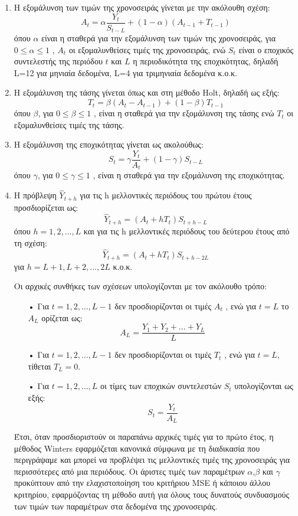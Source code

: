 \begin{enumerate}
\item Η εξομάλυνση των τιμών της χρονοσειράς γίνεται με την ακόλουθη σχέση:\\
$$ A_t=\alpha \frac{Y_t}{S_{t-L}}+\left(1-\alpha\right)\left(A_{t-1}+T_{t-1}\right) $$
όπου $\alpha$ είναι η σταθερά για την εξομάλυνση των τιμών της χρονοσειράς, για
$0 \leq \alpha \leq 1$ , $A_t$ οι εξομαλυνθείσες τιμές της χρονοσειράς, ενώ $S_t$ είναι ο εποχικός
συντελεστής της περιόδου $t$ και $L$ η περιοδικότητα της εποχικότητας, δηλαδή L=12
για μηνιαία δεδομένα, L=4 για τριμηνιαία δεδομένα κ.ο.κ.
\item Η εξομάλυνση της τάσης γίνεται όπως και στη μέθοδο Holt, δηλαδή ως εξής:\\
$$ T_t=\beta \left(A_t-A_{t-1}\right)+\left(1-\beta\right)T_{t-1} $$
όπου $\beta $, για $0 \leq \beta \leq 1$ , είναι η σταθερά για την εξομάλυνση της τάσης ενώ $T_t$ οι
εξομαλυνθείσες τιμές της τάσης.
\item Η εξομάλυνση της εποχικότητας γίνεται ως ακολούθως:\\
$$ S_t=\gamma \frac{Y_t}{A_t}+\left(1-\gamma\right)S_{t-L} $$
όπου $\gamma$, για $0 \leq \gamma \leq 1$ , είναι η σταθερά για την εξομάλυνση της εποχικότητας.
\item Η πρόβλεψη $ \widehat{Y}_{t+h}$ για τις h μελλοντικές περιόδους του πρώτου έτους προσδιορίζεται
ως:\\
$$ \widehat{Y}_{t+h}=\left(A_t+hT_t\right)S_{t+h-L}  $$
όπου $h=1,2,\ldots,L$
και για τις h μελλοντικές περιόδους του δεύτερου έτους από τη σχέση:\\
$$ \widehat{Y}_{t+h}=\left(A_t+hT_t\right)S_{t+h-2L} $$
για $h=L+1, L+2,\ldots,2L$ κ.ο.κ.


Οι αρχικές συνθήκες των σχέσεων υπολογίζονται με τον ακόλουθο τρόπο:\\
\begin{enumerate}
\item[•] Για $t = 1, 2, ..., L-1$ δεν προσδιορίζονται οι τιμές $A_t$ , ενώ για $t=L$ το $A_L$
ορίζεται ως:\\
$$ A_L=\frac{Y_1+Y_2+\ldots+Y_L}{L} $$
\item[•] Για $t = 1, 2,\ldots, L-1$ δεν προσδιορίζονται οι τιμές $T_t$ , ενώ για $t = L$, τίθεται
$T_L =0$.
\item[•] Για $t = 1, 2,\ldots,L$ οι τίμες των εποχικών συντελεστών $S_t$ υπολογίζονται ως
εξής:\\
$$ S_t=\frac{Y_t}{A_L} $$
\end{enumerate}
Έτσι, όταν προσδιοριστούν οι παραπάνω αρχικές τιμές για το πρώτο έτος, η
μέθοδος Winters εφαρμόζεται κανονικά σύμφωνα με τη διαδικασία που
περιγράψαμε και μπορεί να προβλέψει τις μελλοντικές τιμές της χρονοσειράς για
περισσότερες από μια περιόδους. Οι άριστες τιμές των παραμέτρων $\alpha$,$\beta$ και $\gamma$
προκύπτουν από την ελαχιστοποίηση του κριτήριου MSE ή κάποιου άλλου
κριτηρίου, εφαρμόζοντας τη μέθοδο αυτή για όλους τους δυνατούς συνδυασμούς
των τιμών των παραμέτρων στα δεδομένα της χρονοσειράς.



\end{enumerate}

